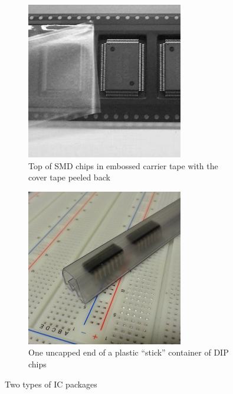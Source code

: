 \documentclass[12pt,oneside,final]{article}
\begin{document}
\begin{figure}[H]%
  \centering%
  \begin{subfigure}{0.45\textwidth}%
    \centering%
    \includegraphics[width=0.75\textwidth]{2012-12-03_smd-tape.jpg}%
    \caption{Top of SMD chips in embossed carrier tape with the cover tape peeled back}%
  \end{subfigure}%
  \hspace{0.1\textwidth}%
  \begin{subfigure}{0.45\textwidth}%
    \centering%
    \includegraphics[width=0.75\textwidth]{2012-09-11_dip-stick-tube.jpg}%
    \caption{One uncapped end of a plastic ``stick'' container of DIP chips}%
  \end{subfigure}%
  \caption{Two types of IC packages}%
  \label{fig:packages}%
\end{figure}
\end{document}
